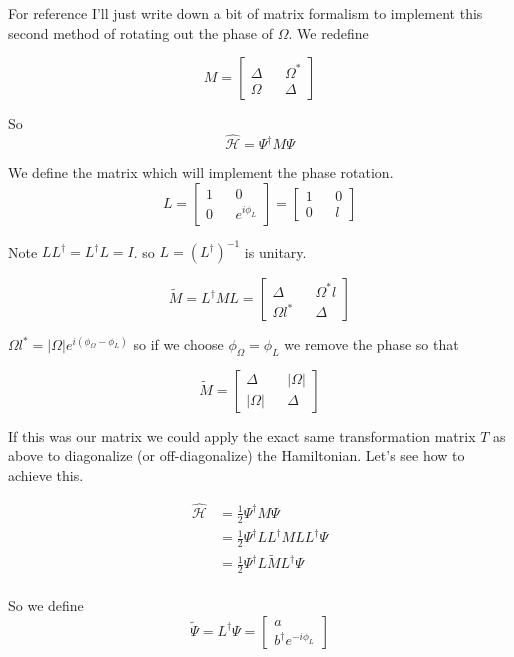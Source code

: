 \documentclass[12pt]{article}
\begin{document}
For reference I'll just write down a bit of matrix formalism to implement this second method of rotating out the phase of $\Omega$.
We redefine

\[
M = \begin{bmatrix}
\Delta && \Omega^*\\
\Omega && \Delta
\end{bmatrix}
\]

So
\[
\hat{\mathcal{H}} = \Psi^{\dag}M\Psi
\]

We define the matrix which will implement the phase rotation.
\[
L = \begin{bmatrix}
1 && 0\\
0 && e^{i\phi_L}
\end{bmatrix}
=
\begin{bmatrix}
1&&0\\
0&&l
\end{bmatrix}
\]

Note $L L^{\dag} = L^{\dag} L = I$. so $L = (L^{\dag})^{-1}$ is unitary.

\[
\tilde{M} = L^{\dag}ML = \begin{bmatrix}
\Delta && \Omega^* l\\
\Omega l^* && \Delta
\end{bmatrix}
\]

$\Omega l^* = |\Omega| e^{i(\phi_{\Omega} - \phi_L)}$ so if we choose $\phi_{\Omega} = \phi_L$ we remove the phase so that

\[
\tilde{M} = \begin{bmatrix}
\Delta && |\Omega|\\
|\Omega| && \Delta
\end{bmatrix}
\]

If this was our matrix we could apply the exact same transformation matrix $T$ as above to diagonalize (or off-diagonalize) the Hamiltonian. Let's see how to achieve this.

\begin{align*}
\hat{\mathcal{H}} &= \frac{1}{2} \Psi^{\dag}M\Psi\\
&=\frac{1}{2}\Psi^{\dag}LL^{\dag}MLL^{\dag}\Psi\\
&=\frac{1}{2}\Psi^{\dag}L\tilde{M}L^{\dag}\Psi\\
\end{align*}

So we define
\[ \tilde{\Psi} = L^{\dag} \Psi = \begin{bmatrix} a\\b^{\dag}e^{-i\phi_L}\end{bmatrix}\]
\end{document}
